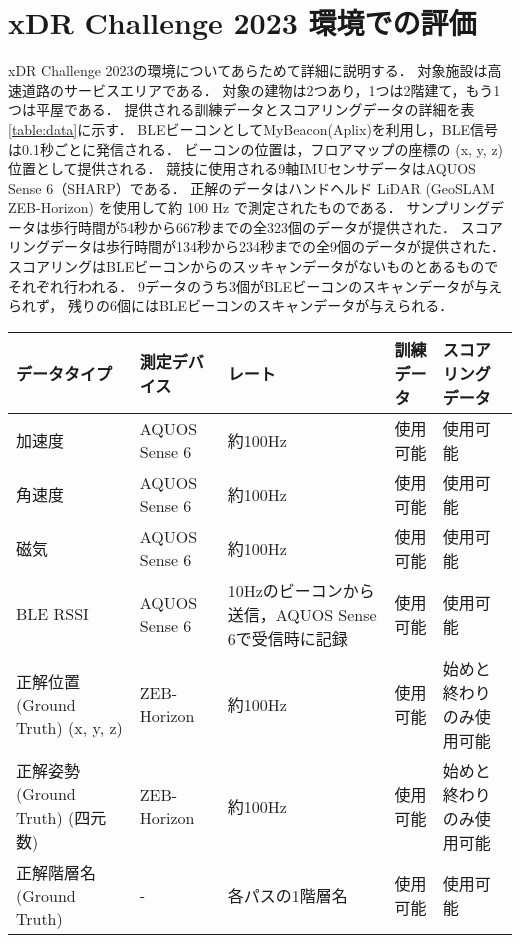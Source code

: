 
\section{xDR Challenge 2023 環境での評価}


xDR Challenge 2023の環境についてあらためて詳細に説明する．
対象施設は高速道路のサービスエリアである．
対象の建物は2つあり，1つは2階建て，もう1つは平屋である．
提供される訓練データとスコアリングデータの詳細を表\ref{table:data}に示す．
BLEビーコンとしてMyBeacon(Aplix)\cite{beacon-aplix}を利用し，BLE信号は0.1秒ごとに発信される．
ビーコンの位置は，フロアマップの座標の (x, y, z) 位置として提供される．
競技に使用される9軸IMUセンサデータはAQUOS Sense 6（SHARP）である．
正解のデータはハンドヘルド LiDAR (GeoSLAM ZEB-Horizon) を使用して約 100 Hz で測定されたものである．
サンプリングデータは歩行時間が54秒から667秒までの全323個のデータが提供された．
スコアリングデータは歩行時間が134秒から234秒までの全9個のデータが提供された．
スコアリングはBLEビーコンからのスッキャンデータがないものとあるものでそれぞれ行われる．
9データのうち3個がBLEビーコンのスキャンデータが与えられず，
残りの6個にはBLEビーコンのスキャンデータが与えられる．

\begin{table*}[ht]
    \centering
    \caption{提供データの概要}
    \begin{tabularx}{\textwidth}{|X|l|X|l|l|}
        \hline
        データタイプ & 測定デバイス & レート & 訓練データ & スコアリングデータ \\ \hline
        加速度 & AQUOS Sense 6 & 約100Hz & 使用可能 & 使用可能 \\ \hline
        角速度 & AQUOS Sense 6 & 約100Hz & 使用可能 & 使用可能 \\ \hline
        磁気 & AQUOS Sense 6 & 約100Hz & 使用可能 & 使用可能 \\ \hline
        BLE RSSI & AQUOS Sense 6 & 10Hzのビーコンから送信，AQUOS Sense 6で受信時に記録 & 使用可能 & 使用可能 \\ \hline
        正解位置 (Ground Truth) (x, y, z) & ZEB-Horizon & 約100Hz & 使用可能 & 始めと終わりのみ使用可能 \\ \hline
        正解姿勢 (Ground Truth) (四元数) & ZEB-Horizon & 約100Hz & 使用可能 & 始めと終わりのみ使用可能 \\ \hline
        正解階層名 (Ground Truth) & - & 各パスの1階層名 & 使用可能 & 使用可能 \\ \hline
    \end{tabularx}
    \label{table:data}
\end{table*}

